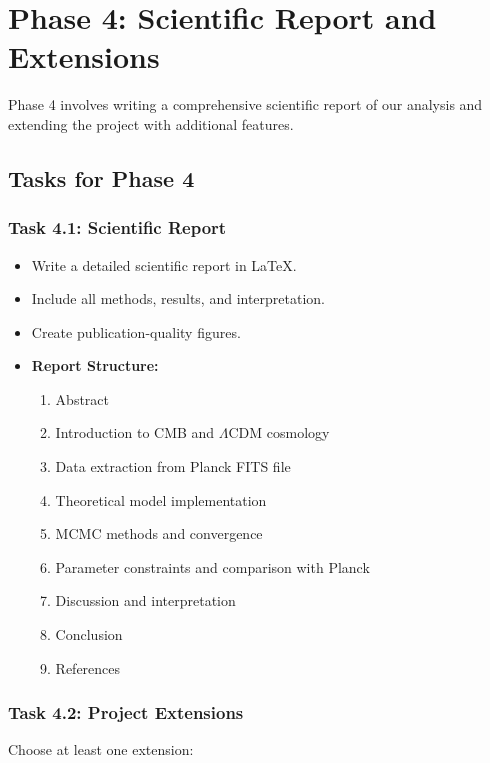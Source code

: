 \documentclass[11pt]{article}
\begin{document}
\section{Phase 4: Scientific Report and Extensions}

Phase 4 involves writing a comprehensive scientific report of our analysis and extending the project with additional features.

\subsection{Tasks for Phase 4}

\subsubsection{Task 4.1: Scientific Report}

\begin{itemize}
    \item Write a detailed scientific report in LaTeX.
    \item Include all methods, results, and interpretation.
    \item Create publication-quality figures.
    
    \item \textbf{Report Structure:}
    \begin{enumerate}
        \item Abstract
        \item Introduction to CMB and $\Lambda$CDM cosmology
        \item Data extraction from Planck FITS file
        \item Theoretical model implementation
        \item MCMC methods and convergence
        \item Parameter constraints and comparison with Planck
        \item Discussion and interpretation
        \item Conclusion
        \item References
    \end{enumerate}
\end{itemize}

\subsubsection{Task 4.2: Project Extensions}

Choose at least one extension:
\end{document}
